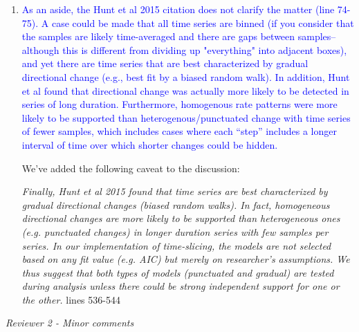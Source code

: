 \documentclass[12pt,letterpaper]{article}
\renewcommand{\subsection}[1]{%
\bigskip
\begin{center}
\begin{large}
\normalfont\itshape #1
\end{large}
\end{center}}
\begin{document}
\begin{enumerate}
\item{\textcolor{blue}{As an aside, the Hunt et al 2015 citation does not clarify the matter (line 74-75). A case could be made that all time series are binned (if you consider that the samples are likely time-averaged and there are gaps between samples--although this is different from dividing up "everything" into adjacent boxes), and yet there are time series that are best characterized by gradual directional change (e.g., best fit by a biased random walk). In addition, Hunt et al found that directional change was actually more likely to be detected in series of long duration. Furthermore, homogenous rate patterns were more likely to be supported than heterogenous/punctuated change with time series of fewer samples, which includes cases where each ``step'' includes a longer interval of time over which shorter changes could be hidden.}}


We've added the following caveat to the discussion:

\textit{Finally, Hunt et al 2015 found that time series are best characterized by gradual directional changes (biased random walks).
In fact, homogeneous directional changes are more likely to be supported than heterogeneous ones (e.g. punctuated changes) in longer duration series with few samples per series.
In our implementation of time-slicing, the models are not selected based on any fit value (e.g. AIC) but merely on researcher's assumptions.
We thus suggest that both types of models (punctuated and gradual) are tested during analysis unless there could be strong independent support for one or the other.} lines 536-544


\end{enumerate}

\subsection{Reviewer 2 - Minor comments}
\end{document}
